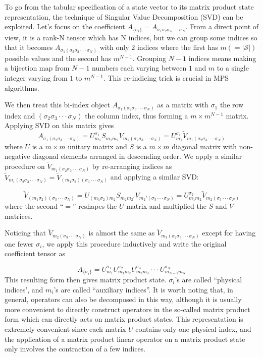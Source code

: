 \documentclass[english]{article}
\begin{document}
To go from the tabular specification of a state vector to its matrix product state representation, the technique of Singular Value Decomposition (SVD) can be exploited. Let's focus on the coefficient $A_{\{\sigma_{i}\}}=A_{\sigma_{1}\sigma_{2}\sigma_{3}\cdot\cdot\cdot\sigma_{N}}$.
From a direct point of view, it is a rank-N tensor which has N indices,
but we can group some indices so that it becomes $A_{\sigma_{1}(\sigma_{2}\sigma_{3}\cdot\cdot\cdot\sigma_{N})}$
with only $2$ indices where the first has $m(=|\mathcal{S}|)$ possible values and
the second has $m^{N-1}$. Grouping $N-1$ indices means making a
bijection map from $N-1$ numbers each varying between $1$ and $m$ to
a single integer varying from $1$ to $m^{N-1}$. This re-indicing
trick is crucial in MPS algorithms.

We then treat this bi-index object $A_{\sigma_{1}(\sigma_{2}\sigma_{3}\cdot\cdot\cdot\sigma_{N})}$
as a matrix with $\sigma_{1}$ the row index and $(\sigma_{2}\sigma_{3}\cdot\cdot\cdot\sigma_{N})$
the column index, thus forming a $m\times m^{N-1}$ matrix. Applying
SVD on this matrix gives 
\[
A_{\sigma_{1}(\sigma_{2}\sigma_{3}\cdot\cdot\cdot\sigma_{N})}=U_{m_{1}}^{\sigma_{1}}S_{m_{1}m_{2}}V_{m_{2}(\sigma_{2}\sigma_{3}\cdot\cdot\cdot\sigma_{N})}=U_{m_{1}}^{\sigma_{1}}\tilde{V}_{m_{1}(\sigma_{2}\sigma_{3}\cdot\cdot\cdot\sigma_{N})}
\]
where $U$ is a $m\times m$ unitary matrix and $S$ is a $m\times m$
diagonal matrix with non-negative diagonal elements arranged in descending
order. We apply a similar procedure on $\tilde{V}_{m_{1}(\sigma_{2}\sigma_{3}\cdot\cdot\cdot\sigma_{N})}$
by re-arranging indices as $\tilde{V}_{m_{1}(\sigma_{2}\sigma_{3}\cdot\cdot\cdot\sigma_{N})}=\tilde{V}_{(m_{1}\sigma_{2})(\sigma_{3}\cdot\cdot\cdot\sigma_{N})}$
and applying a similar SVD:

\[
\tilde{V}_{(m_{1}\sigma_{2})(\sigma_{3}\cdot\cdot\cdot\sigma_{N})}=U_{(m_{1}\sigma_{2})m_{2}}S_{m_{2}m_{2}'}V_{m_{2}'(\sigma_{3}\cdot\cdot\cdot\sigma_{N})}=U_{m_{1}m_{2}}^{\sigma_{2}}\tilde{V}_{m_{2}(\sigma_{3}\cdot\cdot\cdot\sigma_{N})}
\]
where the second ``$=$'' reshapes the $U$ matrix and multiplied
the $S$ and $V$ matrices. 

Noticing that $\tilde{V}_{m_{2}(\sigma_{3}\cdot\cdot\cdot\sigma_{N})}$
is almost the same as $\tilde{V}_{m_{1}(\sigma_{2}\sigma_{3}\cdot\cdot\cdot\sigma_{N})}$
except for having one fewer $\sigma_{i}$, we apply this procedure
inductively and write the original coefficient tensor as

\[
A_{\{\sigma_{i}\}}=U_{m_{1}}^{\sigma_{1}}U_{m_{1}m_{2}}^{\sigma_{2}}U_{m_{2}m_{3}}^{\sigma_{3}}\cdot\cdot\cdot U_{m_{N-1}m_{N}}^{\sigma_{N}}
\]
This resulting form then gives matrix product state. $\sigma_{i}$'s
are called ``physical indices', and $m_{i}$'s are called ``auxiliary
indices''. It is worth noting that, in general, operators can also
be decomposed in this way, although it is usually more convenient
to directly construct operators in the so-called matrix product form which can directly acts on matrix product states. This representation
is extremely convenient since each matrix $U$ contains only one physical
index, and the application of a matrix product linear operator
on a matrix product state only involves the contraction of a few indices.
\end{document}
